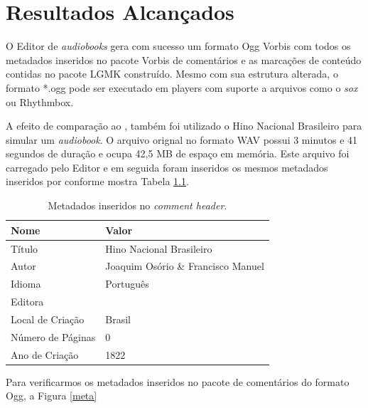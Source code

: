 \chapter[Resultados Alcançados]{Resultados Alcançados}\label{cap5}


O Editor de \textit{audiobooks} gera com sucesso um formato Ogg Vorbis com todos os metadados inseridos no pacote Vorbis de comentários e as marcações de conteúdo contidas no pacote LGMK construído. Mesmo com sua estrutura alterada, o formato *.ogg pode ser executado em players com suporte a arquivos como o \textit{sox} ou Rhythmbox.

A efeito de comparação ao \cite{herbert}, também foi utilizado o Hino Nacional Brasileiro para simular um \textit{audiobook}. O arquivo orignal no formato WAV possui 3 minutos e 41 segundos de duração e ocupa 42,5 MB de espaço em memória. Este arquivo foi carregado pelo Editor e em seguida foram inseridos os mesmos metadados inseridos por \cite{herbert} conforme mostra Tabela \ref{tab1}.

\begin{table}[ht]
\centering
\caption{Metadados inseridos no \textit{comment header}.}
\vspace{0.5cm}
\begin{tabular}{ll}

\hline
\textbf{Nome} & \textbf{Valor} \\
\hline
Título & Hino Nacional Brasileiro \\
Autor & Joaquim Osório \& Francisco Manuel \\
Idioma & Português \\
Editora & \\
Local de Criação & Brasil \\
Número de Páginas & 0 \\
Ano de Criação & 1822 \\
\hline

\end{tabular}
\label{tab1}
\end{table}

Para verificarmos os metadados inseridos no pacote de comentários do formato Ogg, a Figura \ref{meta}

